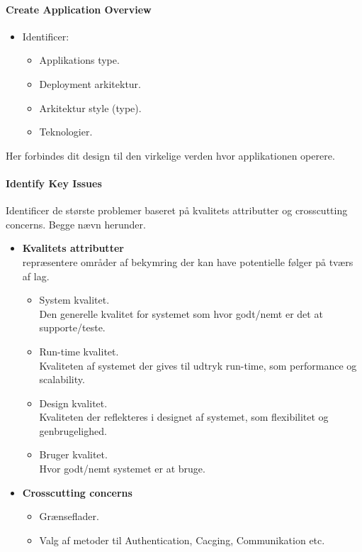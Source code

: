 \paragraph{Create Application Overview}
\begin{itemize}
	\item Identificer:
	\begin{itemize}
		\item Applikations type.
		\item Deployment arkitektur. 
		\item Arkitektur style (type). 
		\item Teknologier. 
	\end{itemize}
\end{itemize}

Her forbindes dit design til den virkelige verden hvor applikationen operere. 

\paragraph{Identify Key Issues}
Identificer de største problemer baseret på kvalitets attributter og crosscutting concerns. Begge nævn herunder.

\begin{itemize}
	\item \textbf{Kvalitets attributter}\\
	repræsentere områder af bekymring der kan have potentielle følger på tværs af lag.
	\begin{itemize}
		\item System kvalitet.\\
		Den generelle kvalitet for systemet som hvor godt/nemt er det at supporte/teste.
		\item Run-time kvalitet.\\
		Kvaliteten af systemet der gives til udtryk run-time, som performance og scalability.
		\item Design kvalitet.\\
		Kvaliteten der reflekteres i designet af systemet, som flexibilitet og genbrugelighed.
		\item Bruger kvalitet.\\
		Hvor godt/nemt systemet er at bruge.
	\end{itemize}
	\item \textbf{Crosscutting concerns}
	\begin{itemize}
		\item Grænseflader.
		\item Valg af metoder til Authentication, Cacging, Communikation etc.
	\end{itemize}
\end{itemize}

